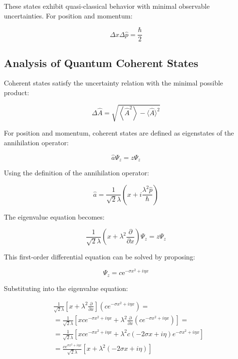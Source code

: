 \documentclass[italian]{HKNdocument}
\begin{document}
These states exhibit quasi-classical behavior with minimal observable uncertainties. For position and momentum:

\begin{equation}
\Delta x \Delta \hat{p}=\frac{\hbar}{2}
\end{equation}


\subsection{Analysis of Quantum Coherent States}
Coherent states satisfy the uncertainty relation with the minimal possible product:

\begin{equation}
\Delta \hat{A}=\sqrt{\left\langle\hat{A}^{2}\right\rangle-\langle\hat{A}\rangle^{2}}
\end{equation}

For position and momentum, coherent states are defined as eigenstates of the annihilation operator:

\begin{equation}
\hat{a} \Psi_{z}=z \Psi_{z}
\end{equation}

Using the definition of the annihilation operator:

\begin{equation}
\hat{a}=\frac{1}{\sqrt{2} \lambda}\left(x+i \frac{\lambda^{2} \hat{p}}{\hbar}\right)
\end{equation}

The eigenvalue equation becomes:

\begin{equation}
\frac{1}{\sqrt{2} \lambda}\left(x+\lambda^{2} \frac{\partial}{\partial x}\right) \Psi_{z}=z \Psi_{z}
\end{equation}

This first-order differential equation can be solved by proposing:

\begin{equation}
\Psi_{z}=c \mathrm{e}^{-\sigma x^{2}+i \eta x}
\end{equation}

Substituting into the eigenvalue equation:

\begin{align}
& \frac{1}{\sqrt{2} \lambda}\left[x+\lambda^{2} \frac{\partial}{\partial x}\right]\left(c e^{-\sigma x^{2}+i \eta x}\right)= \\
& =\frac{1}{\sqrt{2} \lambda}\left[x c e^{-\sigma x^{2}+i \eta x}+\lambda^{2} \frac{\partial}{\partial x}\left(c e^{-\sigma x^{2}+i \eta x}\right)\right]= \\
& =\frac{1}{\sqrt{2} \lambda}\left[x c e^{-\sigma x^{2}+i \eta x}+\lambda^{2} c(-2 \sigma x+i \eta) e^{-\sigma x^{2}+i \eta x}\right]  \\
& =\frac{c e^{\sigma x^{2}+i \eta x}}{\sqrt{2} \lambda}\left[x+\lambda^{2}(-2 \sigma x+i \eta)\right]
\end{align}
\end{document}
